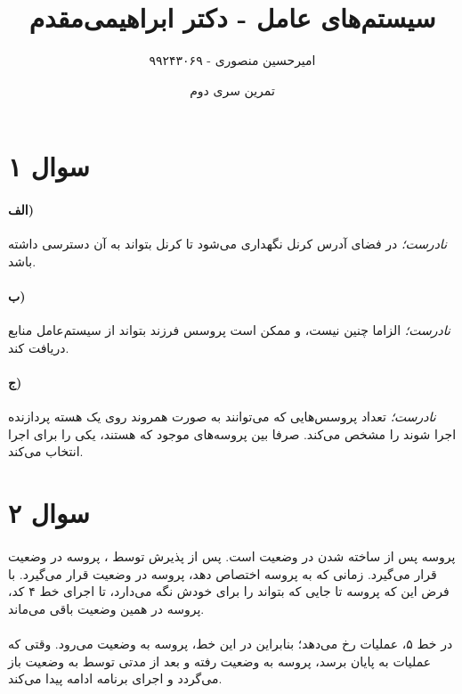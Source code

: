 \documentclass{article}
\title{سیستم‌های عامل - دکتر ابراهیمی‌مقدم}
\author{امیرحسین منصوری - ۹۹۲۴۳۰۶۹}
\date{تمرین سری دوم}
\begin{document}
	\maketitle

	\section*{سوال ۱}
	\paragraph*{الف)}
	\textit{نادرست؛}
	در فضای آدرس کرنل نگهداری می‌شود تا کرنل بتواند به آن دسترسی داشته باشد.

	\paragraph*{ب)}
	\textit{نادرست؛}
	الزاما چنین نیست، و ممکن است پروسس فرزند بتواند از سیستم‌عامل منابع دریافت کند.

	\paragraph*{ج)}
	\textit{نادرست؛}
	تعداد پروسس‌هایی که می‌توانند به صورت همروند روی یک هسته پردازنده اجرا شوند را
	مشخص می‌کند.
	صرفا بین پروسه‌های موجود که
	هستند، یکی را برای اجرا انتخاب می‌کند.

	\section*{سوال ۲}
	\paragraph*{}

	پروسه پس از ساخته شدن در وضعیت
	است. پس از پذیرش توسط
	،
	پروسه در وضعیت
	قرار می‌گیرد. زمانی که
	به پروسه
	اختصاص دهد، پروسه در وضعیت
	قرار می‌گیرد. با فرض این که پروسه تا جایی که بتواند
	را برای خودش نگه می‌دارد، تا اجرای خط ۴ کد، پروسه در همین وضعیت
	باقی می‌ماند.
	\paragraph*{}
	در خط ۵، عملیات
	رخ می‌دهد؛ بنابراین در این خط، پروسه به وضعیت
	می‌رود. وقتی که عملیات
	به پایان برسد، پروسه به وضعیت
	رفته و بعد از مدتی توسط
	به وضعیت
	باز می‌گردد و اجرای برنامه ادامه پیدا می‌کند.
\end{document}
